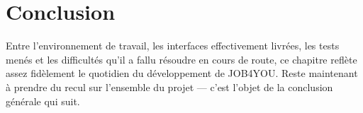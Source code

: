 \section{Conclusion}
\label{sec_4_8}
Entre l’environnement de travail, les interfaces effectivement livrées, les tests menés et les difficultés qu’il a fallu résoudre en cours de route, ce chapitre reflète assez fidèlement le quotidien du développement de JOB4YOU. Reste maintenant à prendre du recul sur l’ensemble du projet — c’est l’objet de la conclusion générale qui suit.
